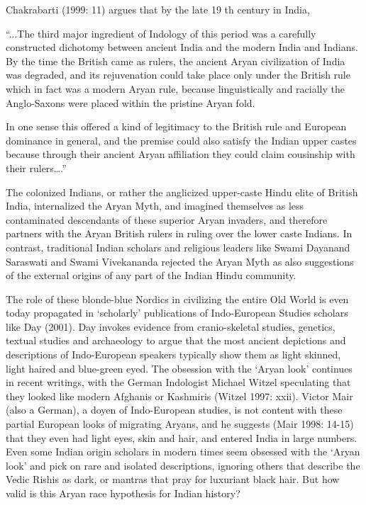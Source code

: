 Chakrabarti (1999: 11) argues that by the late 19 th century in India,

\begin{myquote}
“...The third major ingredient of Indology of this period was a carefully constructed dichotomy between ancient India and the modern India and Indians. By the time the British came as rulers, the ancient Aryan civilization of India was degraded, and its rejuvenation could take place only under the British rule which in fact was a modern Aryan rule, because linguistically and racially the Anglo-Saxons were placed within the pristine Aryan fold.
\end{myquote}

\begin{myquote}
In one sense this offered a kind of legitimacy to the British rule and European dominance in general, and the premise could also satisfy the Indian upper castes because through their ancient Aryan affiliation they could claim cousinship with their rulers….”
\end{myquote}

The colonized Indians, or rather the anglicized upper-caste Hindu elite of British India, internalized the Aryan Myth, and imagined themselves as less contaminated descendants of these superior Aryan invaders, and therefore partners with the Aryan British rulers in ruling over the lower caste Indians. In contrast, traditional Indian scholars and religious leaders like Swami Dayanand Saraswati and Swami Vivekananda rejected the Aryan Myth as also suggestions of the external origins of any part of the Indian Hindu community.

The role of these blonde-blue Nordics in civilizing the entire Old World is even today propagated in ‘scholarly’ publications of Indo-European Studies scholars like Day (2001). Day invokes evidence from cranio-skeletal studies, genetics, textual studies and archaeology to argue that the most ancient depictions and descriptions of Indo-European speakers typically show them as light skinned, light haired and blue-green eyed. The obsession with the ‘Aryan look’ continues in recent writings, with the German Indologist Michael Witzel speculating that they looked like modern Afghanis or Kashmiris (Witzel 1997: xxii). Victor Mair (also a German), a doyen of Indo-European studies, is not content with these partial European looks of migrating Aryans, and he suggests (Mair 1998: 14-15) that they even had light eyes, skin and hair, and entered India in large numbers. Even some Indian origin scholars in modern times seem obsessed with the ‘Aryan look’ and pick on rare and isolated descriptions, ignoring others that describe the Vedic Rishis as dark, or mantras that pray for luxuriant black hair. But how valid is this Aryan race hypothesis for Indian history?

